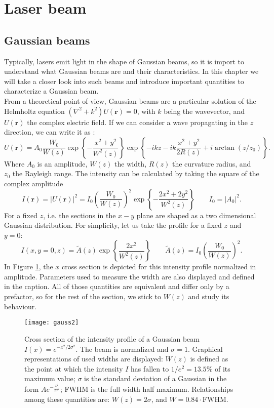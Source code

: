 \section{Laser beam}
\subsection{Gaussian beams}
\label{sec_diffraction}
Typically, lasers emit light in the shape of Gaussian beams, so it is import to understand what Gaussian beams are and their characteristics. In this chapter we will take a closer look into such beams and introduce important quantities to characterize a Gaussian beam. \\
From a theoretical point of view, Gaussian beams are a particular solution of the Helmholtz equation $(\nabla^2 + k^2)U(\mathbf{r}) = 0$, with $k$ being the wavevector, and $U(\mathbf{r})$ the complex electric field. If we can consider a wave propagating in the $z$ direction, we can write it as \cite{saleh}:
\begin{equation}
\label{gaussianbeams}
U(\mathbf{r}) = A_0 \frac{W_0}{W(z)}\exp\left\{-\frac{x^2+y^2}{W^2(z)}\right\}\exp\left\{-ikz-ik\frac{x^2+y^2}{2R(z)}+i\arctan(z/z_0)\right\}.
\end{equation}
Where $A_0$ is an amplitude, $W(z)$ the width, $R(z)$ the curvature radius, and $z_0$ the Rayleigh range. The intensity can be calculated by taking the square of the complex amplitude
\begin{equation}
\label{beamintensity}
I(\mathbf{r}) = |U(\mathbf{r})|^2 = I_0 \left(\frac{W_0}{W(z)}\right)^2 \exp\left\{-\frac{2x^2 + 2y^2}{W^2(z)}\right\}  \qquad I_0 = |A_0|^2.
\end{equation}
For a fixed $z$, i.e. the sections in the $x-y$ plane are shaped as a two dimensional Gaussian distribution. For simplicity, let us take the profile for a fixed $z$ and $y=0$:
\begin{equation}
I(x,y=0,z) = \widetilde{A}(z) \exp\left\{\frac{2x^2}{W^2(z)}\right\} \qquad \widetilde{A}(z) = I_0 \left(\frac{W_0}{W(z)}\right)^2  .
\end{equation}
In Figure \ref{gauss}, the $x$ cross section is depicted for this intensity profile normalized in amplitude. Parameters used to measure the width are also displayed and defined in the caption. All of those quantities are equivalent and differ only by a prefactor, so for the rest of the section, we stick to $W(z)$ and study its behaviour.
\begin{figure}
\centering
\texttt{[image: gauss2]}
\caption{Cross section of the intensity profile of a Gaussian beam $I(x) = e^{-x^2/2\sigma^2}$. The beam is normalized and $\sigma=1$. Graphical representations of used widths are displayed: $W(z)$ is defined as the point at which the intensity $I$ has fallen to $1/e^2 = 13.5\%$ of its maximum value; $\sigma$ is the standard deviation of a Gaussian in the form $Ae^{-\frac{x^2}{2\sigma^2}}$; FWHM is the full width half maximum. Relationships among these quantities are: $W(z) = 2\sigma$, and $W = 0.84\cdot \text{FWHM}$.}
\label{gauss}
\end{figure}
